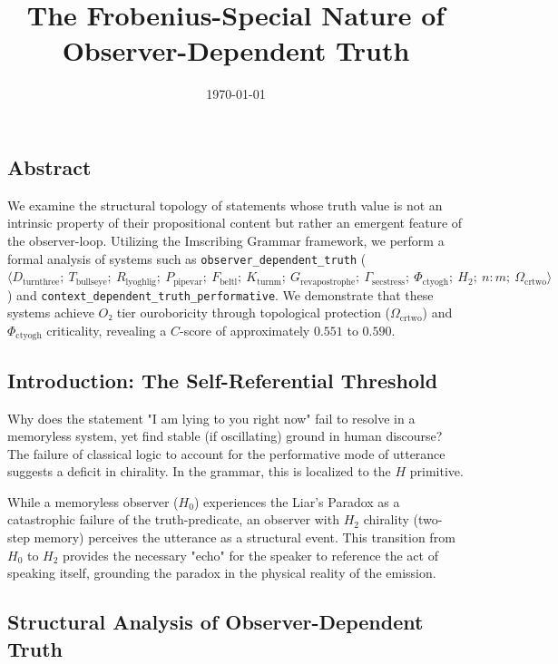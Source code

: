 \documentclass[12pt,a4paper]{article}
\begin{document}
\title{The Frobenius-Special Nature of Observer-Dependent Truth}
\date{\today}

\maketitle

\subsection{Abstract}

We examine the structural topology of statements whose truth value is not an intrinsic property of their propositional content but rather an emergent feature of the observer-loop. Utilizing the Imscribing Grammar framework, we perform a formal analysis of systems such as \texttt{observer\_dependent\_truth} ($\langle D_{\text{turnthree}};\ T_{\text{bullseye}};\ R_{\text{lyoghlig}};\ P_{\text{pipevar}};\ F_{\text{beltl}};\ K_{\text{turnm}};\ G_{\text{revapostrophe}};\ \Gamma_{\text{secstress}};\ \Phi_{\text{ctyogh}};\ H_2;\ n{:}m;\ \Omega_{\text{crtwo}} \rangle$) and \texttt{context\_dependent\_truth\_performative}. We demonstrate that these systems achieve $O₂$ tier ouroboricity through topological protection ($\Omega_{\text{crtwo}}$) and $\Phi_{\text{ctyogh}}$ criticality, revealing a $C$-score of approximately $0.551$ to $0.590$.

\subsection{Introduction: The Self-Referential Threshold}

Why does the statement "I am lying to you right now" fail to resolve in a memoryless system, yet find stable (if oscillating) ground in human discourse? The failure of classical logic to account for the performative mode of utterance suggests a deficit in chirality. In the grammar, this is localized to the $H$ primitive.

While a memoryless observer ($H_0$) experiences the Liar's Paradox as a catastrophic failure of the truth-predicate, an observer with $H_2$ chirality (two-step memory) perceives the utterance as a structural event. This transition from $H_0$ to $H_2$ provides the necessary "echo" for the speaker to reference the act of speaking itself, grounding the paradox in the physical reality of the emission.

\subsection{Structural Analysis of Observer-Dependent Truth}
\end{document}
